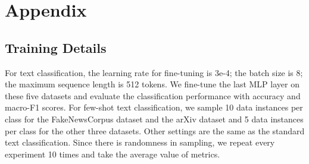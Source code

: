 \documentclass[11pt]{article}
\newcommand{\our}{\mbox{\textsc{DocSplit}}}
\begin{document}
\clearpage
\appendix
\section{Appendix}

\subsection{Training Details}
\label{app:details}
For text classification, the learning rate for fine-tuning is 3e-4; the batch size is 8; the maximum sequence length is 512 tokens. 
We fine-tune the last MLP layer on these five datasets and evaluate the classification performance with accuracy and macro-F1 scores.
For few-shot text classification, we sample 10 data instances per class for the FakeNewsCorpus dataset and the arXiv dataset and 5 data instances per class for the other three datasets. 
Other settings are the same as the standard text classification. 
Since there is randomness in sampling, we repeat every experiment 10 times and take the average value of metrics.



\end{document}
